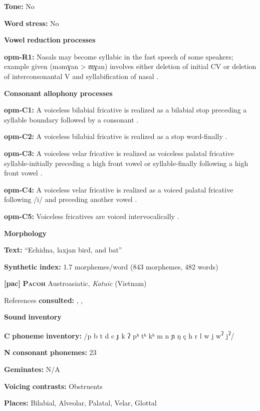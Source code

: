 \textbf{Tone:} No

\textbf{Word} \textbf{stress:} No

\textbf{Vowel} \textbf{reduction} \textbf{processes}

\textbf{opm-R1:} Nasals may become syllabic in the fast speech of some speakers; example given (məmɣan > m̩ɣan) involves either deletion of initial CV or deletion of interconsonantal V and syllabification of nasal \citep[64]{Loughnane2009}.

\textbf{Consonant} \textbf{allophony} \textbf{processes}

\textbf{opm-C1:} A voiceless bilabial fricative is realized as a bilabial stop preceding a syllable boundary followed by a consonant \citep[33]{Loughnane2009}.

\textbf{opm-C2:} A voiceless bilabial fricative is realized as a stop word-finally \citep[33]{Loughnane2009}.

\textbf{opm-C3:} A voiceless velar fricative is realized as voiceless palatal fricative syllable-initially preceding a high front vowel or syllable-finally following a high front vowel \citep[42]{Loughnane2009}.

\textbf{opm-C4:} A voiceless velar fricative is realized as a voiced palatal fricative following /i/ and preceding another vowel \citep[42]{Loughnane2009}.

\textbf{opm-C5:} Voiceless fricatives are voiced intervocalically \citep[42]{Loughnane2009}.

\textbf{Morphology}

\textbf{Text:} “Echidna, laxjan bird, and bat” \citep[493-502]{Loughnane2009}

\textbf{Synthetic} \textbf{index:} 1.7 morphemes/word (843 morphemes, 482 words)

\textbf{[pac]}   \textbf{\textsc{Pacoh}}  Austroasiatic, \textit{Katuic} (Vietnam)

References \textbf{consulted:} \citet{Alves2000}, \citet{Alves2006}, \citet{Watson1980}

\textbf{Sound} \textbf{inventory}

\textbf{C} \textbf{phoneme} \textbf{inventory:} /p b t d c ɟ k ʔ pʰ tʰ kʰ m n ɲ ŋ ç h r l w j w\textsuperscript{ʔ} j\textsuperscript{ʔ}/

\textbf{N} \textbf{consonant} \textbf{phonemes:} 23

\textbf{Geminates:} N/A

\textbf{Voicing} \textbf{contrasts:} Obstruents

\textbf{Places:} Bilabial, Alveolar, Palatal, Velar, Glottal

